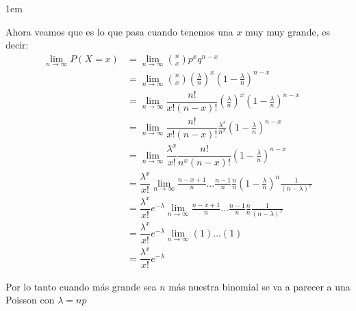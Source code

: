 \documentclass[12pt, fleqn]{report}                             %
\newenvironment{SmallIndentation}[1][0.75em]                    %
        {\begin{adjustwidth}{#1}{}\begin{footnotesize}}             %
        {\end{footnotesize}\end{adjustwidth}}                       %
\theoremstyle{break}                                            %
\newcommand{\Wrap}[1]           {\left( #1 \right)}             %
\begin{document}
\begin{SmallIndentation}[1em]
                    Ahora veamos que es lo que pasa cuando tenemos una $x$ muy muy grande, es decir:
                    \begin{align*}
                        \lim_{n \to \infty} P(X = x) 
                            &= \lim_{n \to \infty} {n \choose x}p^x q^{n - x}                                                               \\
                            &= \lim_{n \to \infty} {n \choose x}\Wrap{\frac{\lambda}{n}}^x \Wrap{1 - \frac{\lambda}{n}}^{n - x}             \\
                            &= \lim_{n \to \infty} \dfrac{n!}{x!(n - x)!} \Wrap{\frac{\lambda}{n}}^x \Wrap{1 - \frac{\lambda}{n}}^{n - x}   \\
                            &= \lim_{n \to \infty} \dfrac{n!}{x!(n - x)!} \frac{\lambda^x}{n^x} \Wrap{1 - \frac{\lambda}{n}}^{n - x}        \\
                            &= \lim_{n \to \infty} \dfrac{\lambda^x}{x!} 
                                \dfrac{n!}{n^x(n - x)!} \Wrap{1 - \frac{\lambda}{n}}^{n - x}                                                \\
                            &= \dfrac{\lambda^x}{x!}  \lim_{n \to \infty} 
                                \frac{n - x + 1}{n} \dots \frac{n - 1}{n}  \frac{n}{n} \Wrap{1 - \frac{\lambda}{n}}^{n} \frac{1}{(n - \lambda)^x} \\
                            &= \dfrac{\lambda^x}{x!} e^{-\lambda} \lim_{n \to \infty} 
                                \frac{n - x + 1}{n} \dots \frac{n - 1}{n}  \frac{n}{n} \frac{1}{(n - \lambda)^x} \\
                            &= \dfrac{\lambda^x}{x!} e^{-\lambda} \lim_{n \to \infty} 
                                (1) \dots (1)  \\
                            &= \dfrac{\lambda^x}{x!} e^{-\lambda} 
                    \end{align*}

                    Por lo tanto cuando más grande sea $n$ más nuestra binomial se va a parecer a una Poisson con $\lambda = np$

                \end{SmallIndentation}
                

            \clearpage
\end{document}
